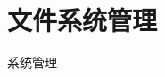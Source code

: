%
%
%
%
%
%
%
%


\section{文件系统管理}
\begin{frame}{系统管理}
	\tableofcontents[currentsection]
\end{frame} 

%

